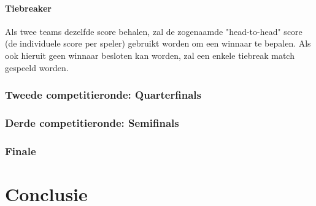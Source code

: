 \documentclass[12pt,a4paper]{article}
\begin{document}
				\paragraph{Tiebreaker}
				Als twee teams dezelfde score behalen, zal de zogenaamde "head-to-head" score (de individuele score per speler) gebruikt worden om een winnaar te bepalen. Als ook hieruit geen winnaar besloten kan worden, zal een enkele tiebreak match gespeeld worden.
			\subsubsection{Tweede competitieronde: Quarterfinals}
				
			\subsubsection{Derde competitieronde: Semifinals}
			\subsubsection{Finale}
	\section{Conclusie}
\end{document}
